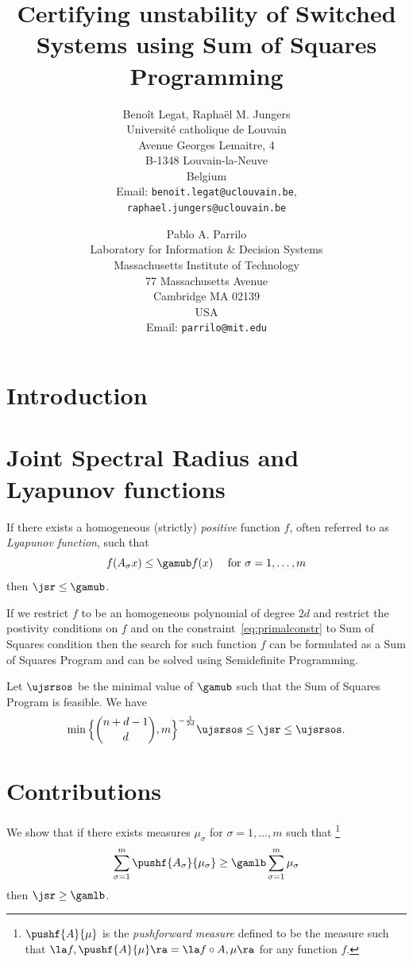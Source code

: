 \documentclass{blux2017}
\title{Certifying unstability of Switched Systems using Sum of Squares Programming}
\author{Beno\^it Legat, Rapha\"el M. Jungers\\
        Universit\'e catholique de Louvain\\
        Avenue Georges Lemaitre, 4\\
        B-1348 Louvain-la-Neuve\\
        Belgium\\
    Email: {\tt benoit.legat@uclouvain.be},\\
           {\tt raphael.jungers@uclouvain.be}
        \and
    Pablo A. Parrilo\\
        Laboratory for Information \& Decision Systems\\
        Massachusetts Institute of Technology\\
        77 Massachusetts Avenue\\
        Cambridge MA 02139\\
        USA\\
    Email: {\tt parrilo@mit.edu} }
\date{}
\begin{document}
\maketitle

\section{Introduction}



\section{Joint Spectral Radius and Lyapunov functions}
\label{sec:jsrlyap}



If there exists a homogeneous (strictly) \emph{positive} function $f$,
often referred to as \emph{Lyapunov function}, such that
\begin{equation}
  \label{eq:primalconstr}
  f(A_\sigma x) \leq \gamub f(x) \quad \text{ for } \sigma = 1, \ldots, m
\end{equation}
then $\jsr \leq \gamub$.

If we restrict $f$ to be an homogeneous polynomial of degree $2d$ and restrict the postivity conditions on $f$ and on the constraint~\eqref{eq:primalconstr}
to Sum of Squares condition then the search for such function $f$ can be formulated as
a Sum of Squares Program and can be solved using Semidefinite Programming.

Let $\ujsrsos$ be the minimal value of $\gamub$ such that the Sum of Squares Program is feasible.
We have
\begin{equation}
  \label{eq:ujsrsosguarantee}
  \min\Big\{{n+d-1 \choose d}, m\Big\}^{-\frac{1}{2d}} \ujsrsos%
  \leq \jsr \leq \ujsrsos.
\end{equation}

\section{Contributions}
We show that if there exists measures $\mu_\sigma$ for $\sigma = 1, \ldots, m$ such that%
\footnote{$\pushf{A}{\mu}$ is the \emph{pushforward measure} defined to be the measure such that
$\la f, \pushf{A}{\mu} \ra = \la f \circ A, \mu \ra$ for any function $f$.}
\begin{equation}
  \label{eq:dualconstr}
  \sum_{\sigma=1}^m \pushf{A_\sigma}{\mu_\sigma} \geq \gamlb \sum_{\sigma=1}^m \mu_\sigma
\end{equation}
then $\jsr \geq \gamlb$.
\end{document}
